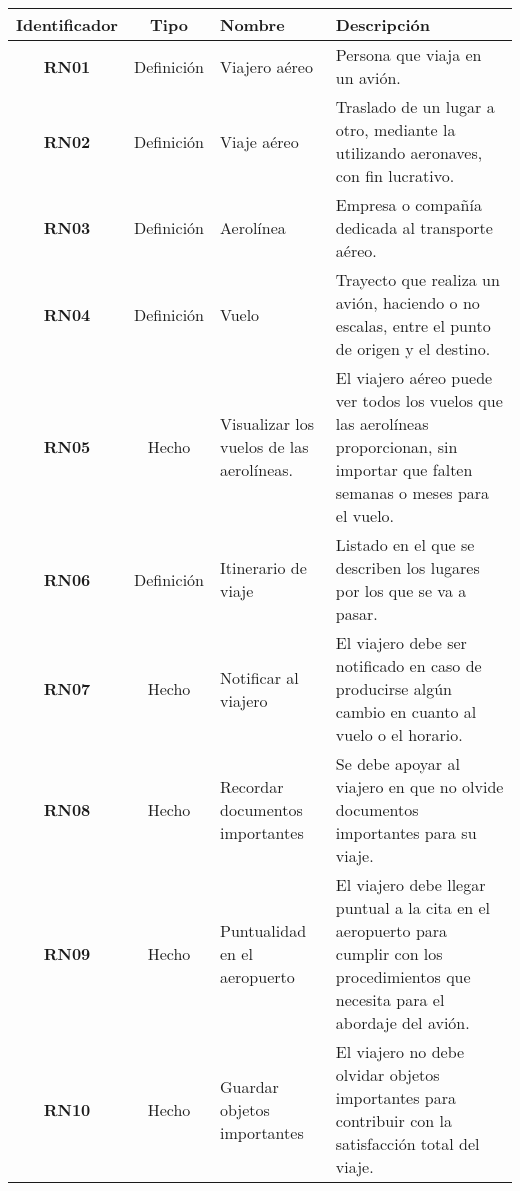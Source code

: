 \begin{table}
	\begin{center}
		\begin{tabular}{|c|c|p{3cm}|p{5.7cm}|}
			\hline \rowcolor[RGB]{51,153,255} 
				\textcolor{blanco}{\bf Identificador} &
				\textcolor{blanco}{\bf Tipo} &
				\textcolor{blanco}{\bf Nombre} &
				\textcolor{blanco}{\bf Descripción} \\
			\hline 
				\textbf{RN01} &
				Definición &
				Viajero aéreo &
				Persona que viaja en un avión. \\
      		\hline \rowcolor[RGB]{240,248,255}
      			\textbf{RN02} &
				Definición &
				Viaje aéreo &
				Traslado de un lugar a otro, mediante la  utilizando aeronaves, con fin lucrativo. \\
			\hline 
				\textbf{RN03} &
				Definición &
				Aerolínea &
				Empresa o compañía dedicada al transporte aéreo. \\ 
			\hline \rowcolor[RGB]{240,248,255}
				\textbf{RN04} &
				Definición &
				Vuelo &
				Trayecto que realiza un avión, haciendo o no escalas, entre el punto de origen y el destino. \\ 
			\hline 
				\textbf{RN05} &
				Hecho &
				Visualizar los vuelos de las aerolíneas. &
				El viajero aéreo puede ver todos los vuelos que las aerolíneas proporcionan, sin importar que falten semanas o meses para el vuelo. \\ 
			\hline \rowcolor[RGB]{240,248,255}
				\textbf{RN06} &
				Definición &
				Itinerario de viaje &
				Listado en el que se describen los lugares por los que se va a pasar. \\ 
			\hline 
				\textbf{RN07} &
				Hecho &
				Notificar al viajero &
				El viajero debe ser notificado en caso de producirse algún cambio en cuanto al vuelo o el horario. \\ 
			\hline \rowcolor[RGB]{240,248,255}
				\textbf{RN08} &
				Hecho &
				Recordar documentos importantes &
				Se debe apoyar al viajero en que no olvide documentos importantes para su viaje. \\ 
			\hline 
				\textbf{RN09} &
				Hecho &
				Puntualidad en el aeropuerto &
				El viajero debe llegar puntual a la cita en el aeropuerto para cumplir con los procedimientos que necesita para el abordaje del avión. \\ 
			\hline \rowcolor[RGB]{240,248,255}
				\textbf{RN10} &
				Hecho &
				Guardar objetos importantes &
				El viajero no debe olvidar objetos importantes para contribuir con la satisfacción total del viaje. \\ 

\end{tabular}
\end{center}
\end{table}
